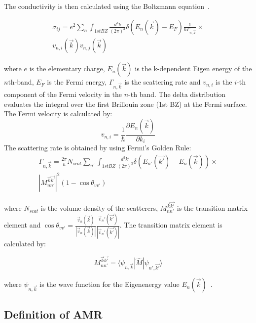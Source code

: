 \documentclass[prb,showpacs,amsmath,amssymb,superscriptaddress,twocolumn,floatfix]{revtex4-1}
\begin{document}
The conductivity is then calculated using the Boltzmann equation~\cite{Vyborny:2009}. 

\begin{multline}
	\sigma_{ij} = e^2 \sum_n  \int_ {1st BZ} \frac{d^3k}{(2\pi)^3} \delta(E_n(\vec{k}) - E_F) \frac{1}{\hbar \Gamma_{n, \vec{k}}} \times \\ v_{n,i}(\vec{k}) v_{n,j}(\vec{k})
	\label{eq_Boltzmann_1}
\end{multline}

where $e$ is the elementary charge, $E_n(\vec{k})$ is the k-dependent Eigen energy of the $n$th-band, $E_F$ is the Fermi energy, $\Gamma_{n, \vec{k}}$ is the scattering rate and $v_{n,i}$ is the $i$-th component of the Fermi velocity in the $n$-th band. The delta distribution evaluates the integral over the first Brillouin zone (1st BZ) at the Fermi surface. The Fermi velocity is calculated by:
%
\begin{equation}
v_{n, i} = \frac{1}{\hbar} \frac{\partial E_n(\vec{k})}{\partial k_i}
\end{equation}
%
The scattering rate is obtained by using Fermi's Golden Rule:
%
\begin{multline}
	\Gamma_{n, \vec{k}} = \frac{2 \pi}{\hbar} N_{scat} \sum_{n'}  \int_ {1st BZ} \frac{d^3k'}{(2\pi)^3} \delta(E_{n'}(\vec{k'}) - E_n(\vec{k})) \times \\ |M^{\vec{k}\vec{k'}}_{nn'} |^2 (1 - \cos \theta_{vv'})
	\label{eq_FermiGoldenRule_1}
\end{multline}

where $N_{scat}$ is the volume density of the scatterers, $M^{\vec{k}\vec{k'}}_{nn'}$ is the transition matrix element and $\cos \theta_{vv'} = \frac{\vec{v}_n (\vec{k})}{|\vec{v}_n (\vec{k})|}\frac{\vec{v}_n' (\vec{k'})}{|\vec{v}_n' (\vec{k'})|}$. The transition matrix element is calculated by:

\begin{equation}
	M^{\vec{k}\vec{k'}}_{nn'} = \langle \psi_{n, \vec{k}}|\hat{M}|\psi_{n', \vec{k'}} \rangle
	\label{eq_transmatrix}
\end{equation}

where $\psi_{n, \vec{k}}$ is the wave function for the Eigenenergy value $E_n(\vec{k})$~\cite{Vyborny:2009}. 

\subsection{Definition of AMR}
\end{document}
